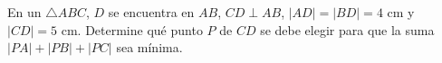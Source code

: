 \item En un $\triangle ABC$, $D$ se encuentra en $AB$, $CD \perp AB$, $|AD| = |BD| = 4 \text{ cm}$ y $|CD| = 5 \text{ cm}$. Determine qué punto $P$ de $CD$ se debe elegir para que la suma $|PA| + |PB| + |PC|$ sea mínima.
